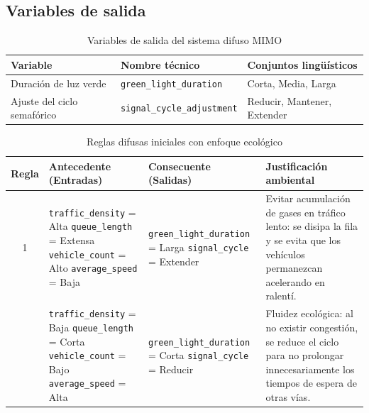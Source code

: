 \documentclass[12pt,a4paper]{article}
\begin{document}
\subsection{Variables de salida}

\begin{table}[H]
\centering
\caption{Variables de salida del sistema difuso MIMO}
\begin{tabular}{lll}
\toprule
\textbf{Variable} & \textbf{Nombre técnico} & \textbf{Conjuntos lingüísticos} \\
\midrule
Duración de luz verde & \texttt{green\_light\_duration} & Corta, Media, Larga \\
Ajuste del ciclo semafórico & \texttt{signal\_cycle\_adjustment} & Reducir, Mantener, Extender \\
\bottomrule
\end{tabular}
\end{table}


\begin{table}[H]
\centering
\caption{Reglas difusas iniciales con enfoque ecológico}
\label{tab:reglas_iniciales}
\renewcommand{\arraystretch}{1.5}
\begin{tabular}{c p{4.8cm} p{4.2cm} p{4.5cm}}
\toprule
\textbf{Regla} & \textbf{Antecedente (Entradas)} & \textbf{Consecuente (Salidas)} & \textbf{Justificación ambiental} \\
\midrule
1 & 
\texttt{traffic\_density} = Alta \newline
\texttt{queue\_length} = Extensa \newline
\texttt{vehicle\_count} = Alto \newline
\texttt{average\_speed} = Baja & 
\texttt{green\_light\_duration} = Larga \newline
\texttt{signal\_cycle} = Extender & 
Evitar acumulación de gases en tráfico lento: se disipa la fila y se evita que los vehículos permanezcan acelerando en ralentí. \\
\addlinespace[1em]
2 & 
\texttt{traffic\_density} = Baja \newline
\texttt{queue\_length} = Corta \newline
\texttt{vehicle\_count} = Bajo \newline
\texttt{average\_speed} = Alta & 
\texttt{green\_light\_duration} = Corta \newline
\texttt{signal\_cycle} = Reducir & 
Fluidez ecológica: al no existir congestión, se reduce el ciclo para no prolongar innecesariamente los tiempos de espera de otras vías. \\
\bottomrule
\end{tabular}
\end{table}
\end{document}
